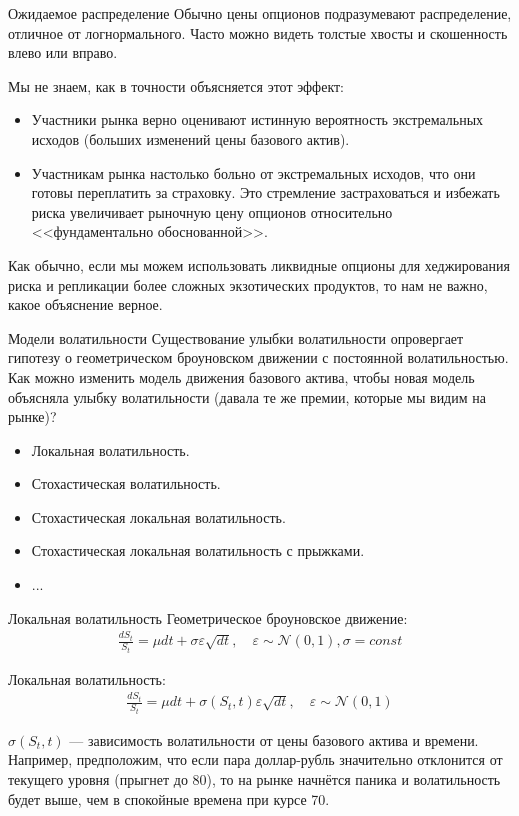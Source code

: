 \documentclass{beamer}
\begin{document}
\begin{frame}{Ожидаемое распределение}
\justify
Обычно цены опционов подразумевают распределение, отличное от логнормального. Часто можно видеть толстые хвосты и скошенность влево или вправо.

\justify
Мы не знаем, как в точности объясняется этот эффект:
\begin{itemize}
\item Участники рынка верно оценивают истинную вероятность экстремальных исходов (больших изменений цены базового актив).
\item Участникам рынка настолько больно от экстремальных исходов, что они готовы переплатить за страховку. Это стремление застраховаться и избежать риска увеличивает рыночную цену опционов относительно <<фундаментально обоснованной>>.
\end{itemize}

\justify
Как обычно, если мы можем использовать ликвидные опционы для хеджирования риска и репликации более сложных экзотических продуктов, то нам не важно, какое объяснение верное.
\end{frame}



\begin{frame}{Модели волатильности}
\justify
Существование улыбки волатильности опровергает гипотезу о геометрическом броуновском движении с постоянной волатильностью. Как можно изменить модель движения базового актива, чтобы новая модель объясняла улыбку волатильности (давала те же премии, которые мы видим на рынке)?

\justify
\begin{itemize}
\item Локальная волатильность.
\item Стохастическая волатильность.
\item Стохастическая локальная волатильность.
\item Стохастическая локальная волатильность с прыжками.
\item ...
\end{itemize}
\end{frame}



\begin{frame}{Локальная волатильность}
\justify
Геометрическое броуновское движение:
\begin{align*}
\frac{dS_t}{S_t} = \mu dt + \sigma\varepsilon\sqrt{dt}, \quad \varepsilon \sim \mathcal{N}(0, 1), \sigma = const
\end{align*}

\justify
Локальная волатильность:
\begin{align*}
\frac{dS_t}{S_t} = \mu dt + \sigma(S_t, t)\varepsilon\sqrt{dt}, \quad \varepsilon \sim \mathcal{N}(0, 1)
\end{align*}

\justify
$\sigma(S_t, t)$ --- зависимость волатильности от цены базового актива и времени. Например, предположим, что если пара доллар-рубль значительно отклонится от текущего уровня (прыгнет до 80), то на рынке начнётся паника и волатильность будет выше, чем в спокойные времена при курсе 70.
\end{frame}
\end{document}
